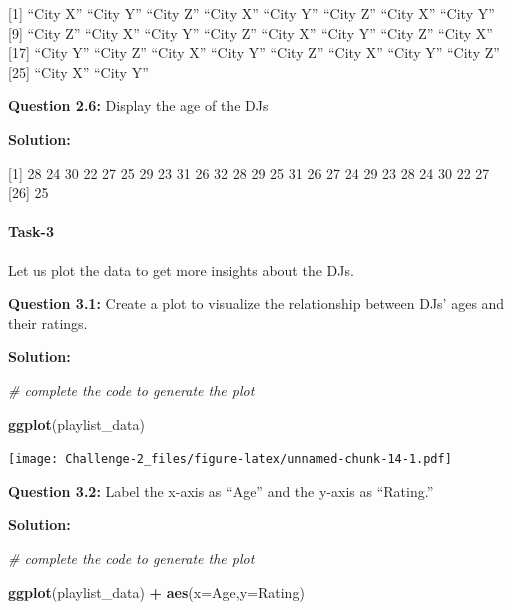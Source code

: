 \documentclass[
]{article}
\newenvironment{Shaded}{\begin{snugshade}}{\end{snugshade}}
\newcommand{\AttributeTok}[1]{\textcolor[rgb]{0.13,0.29,0.53}{#1}}
\newcommand{\CommentTok}[1]{\textcolor[rgb]{0.56,0.35,0.01}{\textit{#1}}}
\newcommand{\FunctionTok}[1]{\textcolor[rgb]{0.13,0.29,0.53}{\textbf{#1}}}
\newcommand{\NormalTok}[1]{#1}
\newcommand{\SpecialCharTok}[1]{\textcolor[rgb]{0.81,0.36,0.00}{\textbf{#1}}}
\begin{document}
{[}1{]} ``City X'' ``City Y'' ``City Z'' ``City X'' ``City Y'' ``City
Z'' ``City X'' ``City Y'' {[}9{]} ``City Z'' ``City X'' ``City Y''
``City Z'' ``City X'' ``City Y'' ``City Z'' ``City X'' {[}17{]} ``City
Y'' ``City Z'' ``City X'' ``City Y'' ``City Z'' ``City X'' ``City Y''
``City Z'' {[}25{]} ``City X'' ``City Y''

\textbf{Question 2.6:} Display the age of the DJs

\textbf{Solution:}

\begin{Shaded}
\end{Shaded}

{[}1{]} 28 24 30 22 27 25 29 23 31 26 32 28 29 25 31 26 27 24 29 23 28
24 30 22 27 {[}26{]} 25

\hypertarget{task-3}{%
\paragraph{Task-3}\label{task-3}}

Let us plot the data to get more insights about the DJs.

\textbf{Question 3.1:} Create a plot to visualize the relationship
between DJs' ages and their ratings.

\textbf{Solution:}

\begin{Shaded}
\begin{Highlighting}[]
\CommentTok{\# complete the code to generate the plot}

\FunctionTok{ggplot}\NormalTok{(playlist\_data)}
\end{Highlighting}
\end{Shaded}

\texttt{[image: Challenge-2\_files/figure-latex/unnamed-chunk-14-1.pdf]}

\textbf{Question 3.2:} Label the x-axis as ``Age'' and the y-axis as
``Rating.''

\textbf{Solution:}

\begin{Shaded}
\begin{Highlighting}[]
\CommentTok{\# complete the code to generate the plot}

\FunctionTok{ggplot}\NormalTok{(playlist\_data) }\SpecialCharTok{+} \FunctionTok{aes}\NormalTok{(}\AttributeTok{x=}\NormalTok{Age,}\AttributeTok{y=}\NormalTok{Rating)}
\end{Highlighting}
\end{Shaded}
\end{document}
